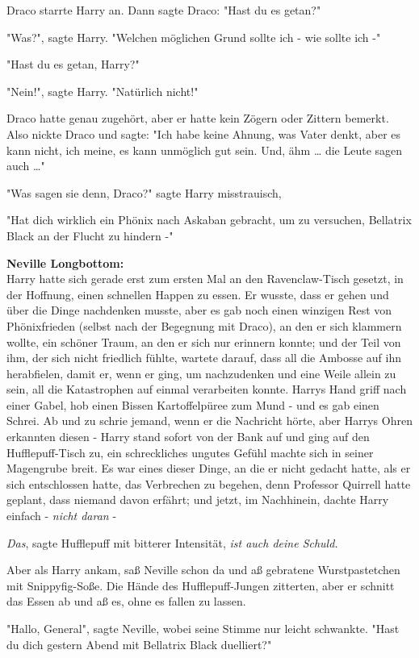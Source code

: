 {Draco starrte Harry an. Dann sagte Draco: "Hast du es getan?"

"Was?", sagte Harry. "Welchen möglichen Grund sollte ich - wie sollte ich -"

"Hast du es getan, Harry?"

"Nein!", sagte Harry. "Natürlich nicht!"

Draco hatte genau zugehört, aber er hatte kein Zögern oder Zittern bemerkt. Also nickte Draco und sagte: "Ich habe keine Ahnung, was Vater denkt, aber es kann nicht, ich meine, es kann unmöglich gut sein. Und, ähm … die Leute sagen auch …"

"Was sagen sie denn, Draco?" sagte Harry misstrauisch,

"Hat dich wirklich ein Phönix nach Askaban gebracht, um zu versuchen, Bellatrix Black an der Flucht zu hindern -"

\textbf{Neville Longbottom:}\\ Harry hatte sich gerade erst zum ersten Mal an den Ravenclaw-Tisch gesetzt, in der Hoffnung, einen schnellen Happen zu essen. Er wusste, dass er gehen und über die Dinge nachdenken musste, aber es gab noch einen winzigen Rest von Phönixfrieden (selbst nach der Begegnung mit Draco), an den er sich klammern wollte, ein schöner Traum, an den er sich nur erinnern konnte; und der Teil von ihm, der sich nicht friedlich fühlte, wartete darauf, dass all die Ambosse auf ihn herabfielen, damit er, wenn er ging, um nachzudenken und eine Weile allein zu sein, all die Katastrophen auf einmal verarbeiten konnte. Harrys Hand griff nach einer Gabel, hob einen Bissen Kartoffelpüree zum Mund - und es gab einen Schrei. Ab und zu schrie jemand, wenn er die Nachricht hörte, aber Harrys Ohren erkannten diesen - Harry stand sofort von der Bank auf und ging auf den Hufflepuff-Tisch zu, ein schreckliches ungutes Gefühl machte sich in seiner Magengrube breit. Es war eines dieser Dinge, an die er nicht gedacht hatte, als er sich entschlossen hatte, das Verbrechen zu begehen, denn Professor Quirrell hatte geplant, dass niemand davon erfährt; und jetzt, im Nachhinein, dachte Harry einfach - \emph{nicht daran} -

\emph{Das}, sagte Hufflepuff mit bitterer Intensität, \emph{ist auch deine Schuld.}

Aber als Harry ankam, saß Neville schon da und aß gebratene Wurstpastetchen mit Snippyfig-Soße. Die Hände des Hufflepuff-Jungen zitterten, aber er schnitt das Essen ab und aß es, ohne es fallen zu lassen.

"Hallo, General", sagte Neville, wobei seine Stimme nur leicht schwankte. "Hast du dich gestern Abend mit Bellatrix Black duelliert?"

}
